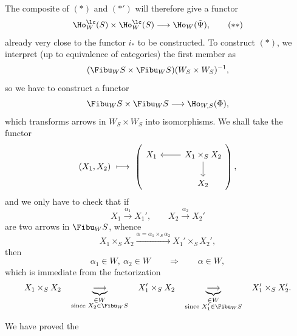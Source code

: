 The composite of $(*)$ and $(*')$ will therefore give a functor
\[
\Ho^{\lc}_W(S) \times \Ho^{\lc}_W(S) \longrightarrow \Ho_W(\tilde{\Psi}), \tag*{$(**)$}
\]
already very close to the functor $i_*$ to be constructed. To construct $(*)$, we interpret (up to equivalence of categories) the first member as
\[
(\Fibu_W S \times \Fibu_W S)(W_S \times W_S)^{-1},
\]
so we have to construct a functor
\[
\Fibu_W S \times \Fibu_W S \longrightarrow \Ho_{W,S}(\Phi),
\]
which transforms arrows in $W_S \times W_S$ into isomorphisms. We shall take the functor
\[
(X_1, X_2) \ \longmapsto \
\left(
\begin{tikzcd}[ampersand replacement=\&]
X_1 \& X_1 \times_S X_2 \arrow[l] \arrow[d] \\
 \& X_2
\end{tikzcd}
\right),
\]
and we only have to check that if
\[
X_1 \xrightarrow{\alpha_1} X_1', \qquad X_2 \xrightarrow{\alpha_2} X_2'
\]
are two arrows in $\Fibu_W S$, whence
\[
X_1 \times_S X_2 \xrightarrow{\alpha = \alpha_1 \times_S \alpha_2} X_1' \times_S X_2',
\]
then
\[
\alpha_1 \in W,\ \alpha_2 \in W \qquad \Longrightarrow \qquad \alpha \in W,
\]
which is immediate from the factorization
\[
X_1 \times_S X_2 \quad \underbrace{\longrightarrow}_{\substack{\in W \\ \text{since } X_2 \in \Fibu_W S}} \quad X_1' \times_S X_2 \quad \underbrace{\longrightarrow}_{\substack{\in W \\ \text{since } X_1' \in \Fibu_W S}} \quad X_1' \times_S X_2'.
\]

We have proved the

